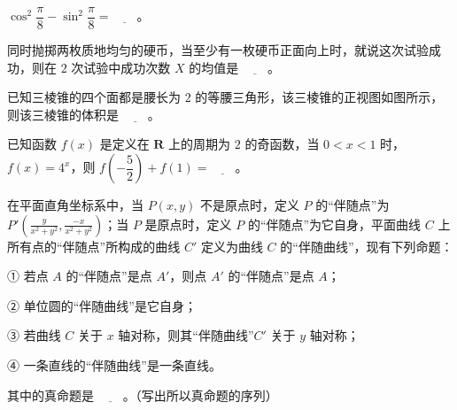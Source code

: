 \begin{question}
\(\cos^{2}\dfrac{\pi}{8}-\sin^{2}\dfrac{\pi}{8}=\underline{\qquad}\)。

\end{question}
\begin{question}
同时抛掷两枚质地均匀的硬币，当至少有一枚硬币正面向上时，就说这次试验成功，则在 \(2\) 次试验中成功次数 \(X\) 的均值是 \(\underline{\qquad}\)。

\Needspace{0.4\textheight}
\end{question}
\begin{question}
已知三棱锥的四个面都是腰长为 \(2\) 的等腰三角形，该三棱锥的正视图如图所示，则该三棱锥的体积是 \(\underline{\qquad}\)。
\nopagebreak[4]
\begin{center}\end{center}
\nopagebreak[4]
\end{question}
\begin{question}
已知函数 \(f(x)\) 是定义在 \(\mathbf{R}\) 上的周期为 \(2\) 的奇函数，当 \(0<x<1\) 时，\(f(x)=4^{x}\)，则 \(f\left(-\dfrac{5}{2}\right)+f(1)=\underline{\qquad}\)。

\end{question}
\begin{question}
在平面直角坐标系中，当 \(P(x,y)\) 不是原点时，定义 \(P\) 的“伴随点”为 \(P'\left(\frac{y}{x^{2}+y^{2}},\frac{-x}{x^{2}+y^{2}}\right)\)；当 \(P\) 是原点时，定义 \(P\) 的“伴随点”为它自身，平面曲线 \(C\) 上所有点的“伴随点”所构成的曲线 \(C'\) 定义为曲线 \(C\) 的“伴随曲线”，现有下列命题：

① 若点 \(A\) 的“伴随点”是点 \(A'\)，则点 \(A'\) 的“伴随点”是点 \(A\)；

② 单位圆的“伴随曲线”是它自身；

③ 若曲线 \(C\) 关于 \(x\) 轴对称，则其“伴随曲线”\(C'\) 关于 \(y\) 轴对称；

④ 一条直线的“伴随曲线”是一条直线。

其中的真命题是 \(\underline{\qquad}\)。（写出所以真命题的序列）

\end{question}

